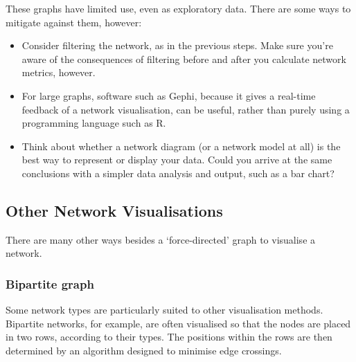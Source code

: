 \documentclass[
]{book}
\begin{document}
These graphs have limited use, even as exploratory data. There are some ways to mitigate against them, however:

\begin{itemize}
\item
  Consider filtering the network, as in the previous steps. Make sure you're aware of the consequences of filtering before and after you calculate network metrics, however.
\item
  For large graphs, software such as Gephi, because it gives a real-time feedback of a network visualisation, can be useful, rather than purely using a programming language such as R.
\item
  Think about whether a network diagram (or a network model at all) is the best way to represent or display your data. Could you arrive at the same conclusions with a simpler data analysis and output, such as a bar chart?
\end{itemize}

\hypertarget{other-network-visualisations}{%
\subsection{Other Network Visualisations}\label{other-network-visualisations}}

There are many other ways besides a `force-directed' graph to visualise a network.

\hypertarget{bipartite-graph}{%
\subsubsection{Bipartite graph}\label{bipartite-graph}}

Some network types are particularly suited to other visualisation methods. Bipartite networks, for example, are often visualised so that the nodes are placed in two rows, according to their types. The positions within the rows are then determined by an algorithm designed to minimise edge crossings.
\end{document}
